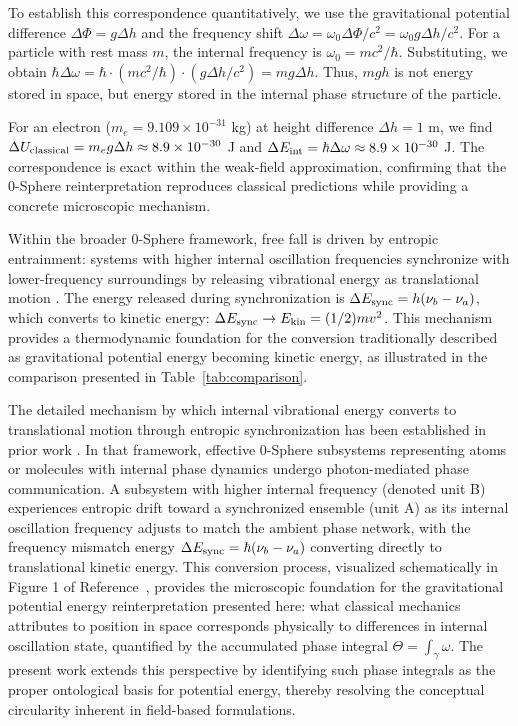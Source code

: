 \documentclass[%
 reprint,
 amsmath,amssymb,
 aps,
 prb,
]{revtex4-2}
\numberwithin{equation}{section}
\begin{document}
To establish this correspondence quantitatively, we use the gravitational potential difference $\Delta \Phi = g \Delta h$ and the frequency shift $\Delta \omega = \omega_0 \Delta \Phi/c^2 = \omega_0 g \Delta h/c^2$. For a particle with rest mass $m$, the internal frequency is $\omega_0 = mc^2/\hbar$. Substituting, we obtain $\hbar \Delta \omega = \hbar \cdot (mc^2/\hbar) \cdot (g \Delta h/c^2) = mg\Delta h$. Thus, $mgh$ is not energy stored in space, but energy stored in the internal phase structure of the particle.

For an electron ($m_e = 9.109 \times 10^{-31}$ kg) at height difference $\Delta h = 1$ m, we find $\Delta U_{\rm classical} = m_e g \Delta h \approx 8.9 \times 10^{-30}$ J and $\Delta E_{\rm int} = \hbar \Delta \omega \approx 8.9 \times 10^{-30}$ J. The correspondence is exact within the weak-field approximation, confirming that the 0-Sphere reinterpretation reproduces classical predictions while providing a concrete microscopic mechanism.

Within the broader 0-Sphere framework, free fall is driven by entropic entrainment: systems with higher internal oscillation frequencies synchronize with lower-frequency surroundings by releasing vibrational energy as translational motion \cite{Hanamura2026Geometrical}. The energy released during synchronization is $\Delta E_{\rm sync} = h(\nu_b - \nu_a)$, which converts to kinetic energy: $\Delta E_{\rm sync} \to E_{\rm kin} = (1/2)mv^2$. This mechanism provides a thermodynamic foundation for the conversion traditionally described as gravitational potential energy becoming kinetic energy, as illustrated in the comparison presented in Table~\ref{tab:comparison}.

The detailed mechanism by which internal vibrational energy converts to translational motion through entropic synchronization has been established in prior work \cite{Hanamura2026Geometrical}. In that framework, effective 0-Sphere subsystems representing atoms or molecules with internal phase dynamics undergo photon-mediated phase communication. A subsystem with higher internal frequency (denoted unit B) experiences entropic drift toward a synchronized ensemble (unit A) as its internal oscillation frequency adjusts to match the ambient phase network, with the frequency mismatch energy $\Delta E_{\rm sync} = \hbar(\nu_b - \nu_a)$ converting directly to translational kinetic energy. This conversion process, visualized schematically in Figure 1 of Reference~\cite{Hanamura2026Geometrical}, provides the microscopic foundation for the gravitational potential energy reinterpretation presented here: what classical mechanics attributes to position in space corresponds physically to differences in internal oscillation state, quantified by the accumulated phase integral $\Theta = \int_\gamma \omega$. The present work extends this perspective by identifying such phase integrals as the proper ontological basis for potential energy, thereby resolving the conceptual circularity inherent in field-based formulations.
\end{document}
